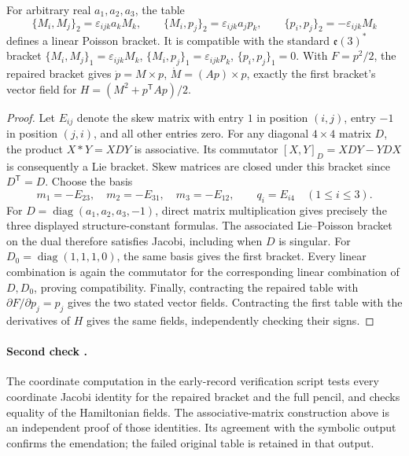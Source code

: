 \begin{proposition}
For arbitrary real \(a_1,a_2,a_3\), the table
\[
 \{M_i,M_j\}_2=\varepsilon_{ijk}a_kM_k,\qquad
 \{M_i,p_j\}_2=\varepsilon_{ijk}a_jp_k,\qquad
 \{p_i,p_j\}_2=-\varepsilon_{ijk}M_k
\]
defines a linear Poisson bracket. It is compatible with the standard
\(\mathfrak e(3)^*\) bracket
\(\{M_i,M_j\}_1=\varepsilon_{ijk}M_k\),
\(\{M_i,p_j\}_1=\varepsilon_{ijk}p_k\),
\(\{p_i,p_j\}_1=0\).
With \(F=p^2/2\), the repaired bracket gives
\(\dot p=M\times p\), \(\dot M=(Ap)\times p\), exactly the
first bracket's vector field for
\(H=(M^2+p^{\mathsf T}Ap)/2\).
\end{proposition}
\begin{proof}
Let \(E_{ij}\) denote the skew matrix with entry \(1\) in position
\((i,j)\), entry \(-1\) in position \((j,i)\), and all other entries
zero. For any diagonal \(4\times4\) matrix \(D\), the product
\(X*Y=XDY\) is associative. Its commutator
\([X,Y]_D=XDY-YDX\) is consequently a Lie bracket.
Skew matrices are closed under this bracket since \(D^{\mathsf T}=D\).
Choose the basis
\[
 m_1=-E_{23},\quad m_2=-E_{31},\quad m_3=-E_{12},\qquad
 q_i=E_{i4}\quad(1\leq i\leq3).
\]
For \(D=\operatorname{diag}(a_1,a_2,a_3,-1)\), direct matrix
multiplication gives precisely the three displayed structure-constant
formulas. The associated Lie--Poisson bracket on the dual therefore
satisfies Jacobi, including when \(D\) is singular.
For \(D_0=\operatorname{diag}(1,1,1,0)\), the same basis gives the
first bracket. Every linear combination is again the commutator for
the corresponding linear combination of \(D,D_0\), proving compatibility.
Finally, contracting the repaired table with
\(\partial F/\partial p_j=p_j\) gives the two stated vector fields.
Contracting the first table with the derivatives of \(H\) gives the
same fields, independently checking their signs.
\end{proof}

\paragraph{Second check \oursComputed.}
The coordinate computation in the early-record verification script
tests every coordinate Jacobi identity for the repaired bracket and
the full pencil, and checks equality of the Hamiltonian fields.
The associative-matrix construction above is an independent proof
of those identities. Its agreement with the symbolic output confirms
the emendation; the failed original table is retained in that output.

